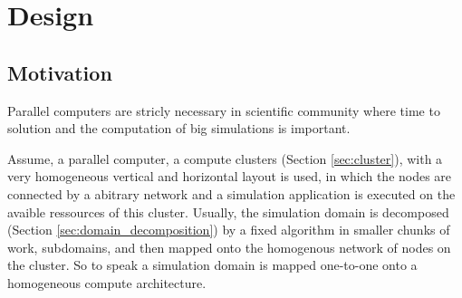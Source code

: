 \chapter{Design}
\label{sec:design}



\section{Motivation}

  Parallel computers are stricly necessary in scientific community
  where time to solution and the computation of big simulations
  is important. 


  Assume, a parallel computer, a compute clusters (Section
  \ref{sec:cluster}), with a very homogeneous vertical and horizontal
  layout is used, in which the nodes are connected by a abitrary
  network and a simulation application is executed on the avaible
  ressources of this cluster. Usually, the simulation domain is
  decomposed (Section \ref{sec:domain_decomposition}) by a fixed
  algorithm in smaller chunks of work, subdomains, and then mapped
  onto the homogenous network of nodes on the cluster. So to speak a
  simulation domain is mapped one-to-one onto a
  homogeneous compute architecture. 

